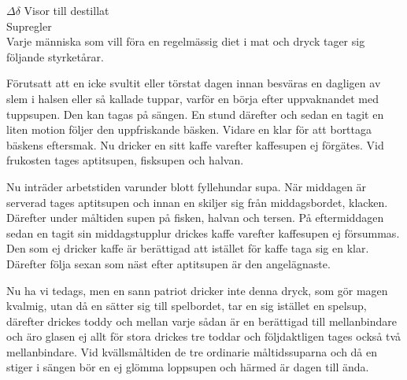 \documentclass[a6paper,10pt]{article}
\begin{document}
\noindent
\huge{$\Delta\delta$ Visor till destillat}
\vspace{10pt} \\
\Large Supregler\\
\small 
Varje människa som vill föra en regelmässig diet i mat och dryck tager sig följande styrketårar.

Förutsatt att en icke svultit eller törstat dagen innan besväras en dagligen av slem i halsen eller så kallade tuppar, varför en börja efter uppvaknandet med tuppsupen. Den kan tagas på sängen. En stund därefter och sedan en tagit en liten motion följer den uppfriskande bäsken. Vidare en klar för att borttaga bäskens eftersmak. Nu dricker en sitt kaffe varefter kaffesupen ej förgätes. Vid frukosten tages aptitsupen, fisksupen och halvan.

Nu inträder arbetstiden varunder blott fyllehundar supa. När middagen är serverad tages aptitsupen och innan en skiljer sig från middagsbordet, klacken. Därefter under måltiden supen på fisken, halvan och tersen. På eftermiddagen sedan en tagit sin middagstupplur drickes kaffe varefter kaffesupen ej försummas. Den som ej dricker kaffe är berättigad att istället för kaffe taga sig en klar. Därefter följa sexan som näst efter aptitsupen är den angelägnaste.

Nu ha vi tedags, men en sann patriot dricker inte denna dryck, som gör magen kvalmig, utan då en sätter sig till spelbordet, tar en sig istället en spelsup, därefter drickes toddy och mellan varje sådan är en berättigad till mellanbindare och äro glasen ej allt för stora drickes tre toddar och följdaktligen tages också två mellanbindare. Vid kvällsmåltiden de tre ordinarie måltidssuparna och då en stiger i sängen bör en ej glömma loppsupen och härmed är dagen till ända. 
\end{document}

